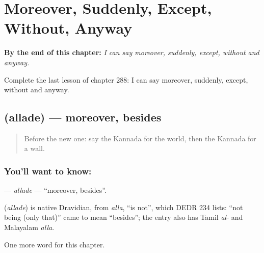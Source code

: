 
\chapter{Moreover, Suddenly, Except, Without, Anyway}
\label{ch:ka-moreover-suddenly-except-without-anyway}

\begin{chapteropening}
\textbf{By the end of this chapter:} \emph{I can say moreover, suddenly, except, without and anyway.}

Complete the last lesson of chapter 288: I can say moreover, suddenly, except, without and anyway.
\end{chapteropening}

\section[\texorpdfstring{\kn{ಅಲ್ಲದೆ} (allade)}{ಅಲ್ಲದೆ (allade)}]{ (allade) — moreover, besides}

\label{lesson:KA-C288-allade}



\begin{quote}
Before the new one: say the Kannada for the world, then the Kannada for a wall.
\end{quote}

\subsection*{You'll want to know: }
\textbf{} — \emph{allade} — \textquotedblleft{}moreover, besides\textquotedblright{}.

\begin{cousinweb}
\textbf{} (\emph{allade}) is native Dravidian, from \emph{alla}, \textquotedblleft{}is not\textquotedblright{}, which DEDR 234 lists: \textquotedblleft{}not being (only that)\textquotedblright{} came to mean \textquotedblleft{}besides\textquotedblright{}; the entry also has Tamil \emph{al-} and Malayalam \emph{alla}.
\end{cousinweb}

\begin{grammarlens}[title={What you've built}]
One more word for this chapter.
\end{grammarlens}

